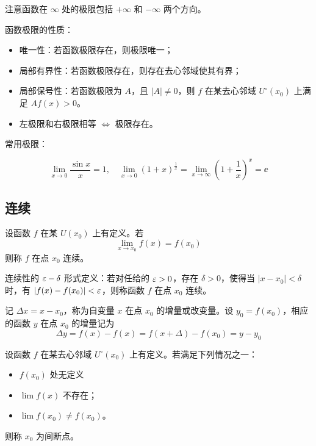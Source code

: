 \begin{note}
	注意函数在 $\infty$ 处的极限包括 $+\infty$ 和 $-\infty$ 两个方向。
\end{note}

函数极限的性质：

\begin{itemize}
	\item 唯一性：若函数极限存在，则极限唯一；
	\item 局部有界性：若函数极限存在，则存在去心邻域使其有界；
	\item 局部保号性：若函数极限为 $A$，且 $|A| \neq 0$，则 $f$ 在某去心邻域 $U^\circ(x_0)$ 上满足 $Af(x) > 0$。
	\item 左极限和右极限相等 $\Longleftrightarrow$ 极限存在。
\end{itemize}

常用极限：

\[ \lim_{x \to 0} \frac{\sin x}{x} = 1, \quad \lim_{x \to 0} (1+x)^{\frac{1}{x}} = \lim_{x \to \infty} \left(1 + \frac{1}{x}\right)^x = \ee \]


\subsection{连续}

\begin{definition}[连续性]
	设函数 $f$ 在某 $U(x_0)$ 上有定义。若
	\[ \lim_{x\to x_0}f(x) = f(x_0) \]
	则称 $f$ 在点 $x_0$ 连续。

	连续性的 $\varepsilon-\delta$ 形式定义：若对任给的 $\varepsilon>0$，存在 $\delta>0$，使得当 $|x-x_0|<\delta$ 时，有 $|f(x)-f(x_0)|<\varepsilon$，则称函数 $f$ 在点 $x_0$ 连续。
\end{definition}

记 $\Delta x = x-x_0$，称为自变量 $x$ 在点 $x_0$ 的增量或改变量。设 $y_0=f(x_0)$，相应的函数 $y$ 在点 $x_0$ 的增量记为
\[ \Delta y = f(x)-f(x) = f(x+\Delta)-f(x_0) = y-y_0 \]



\begin{definition}[间断点]
	设函数 $f$ 在某去心邻域 $U^\circ(x_0)$ 上有定义。若满足下列情况之一：
	\begin{itemize}
		\item $f(x_0)$ 处无定义
		\item $\lim f(x)$ 不存在；
		\item $\lim f(x_0) \neq f(x_0)$。
	\end{itemize}
	则称 $x_0$ 为间断点。
\end{definition}

